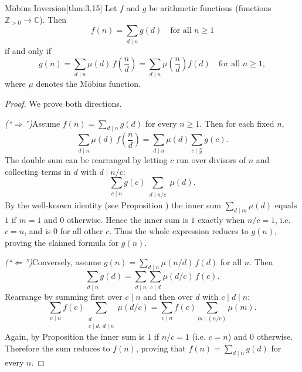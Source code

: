 \documentclass[10pt]{article}
\theoremstyle{definition}
\theoremstyle{plain}
\numberwithin{equation}{section}
\begin{document}

\begin{define}{Möbius Inversion}[thm:3.15]
Let $f$ and $g$ be arithmetic functions (functions $\mathbb{Z}_{>0}\to\mathbb{C}$). Then
\[
f(n)=\sum_{d\mid n} g(d)\quad\text{for all }n\ge 1
\]
if and only if
\[
g(n)=\sum_{d\mid n}\mu(d)\,f\!\left(\frac{n}{d}\right)
    =\sum_{d\mid n}\mu\!\left(\frac{n}{d}\right) f(d)
\quad\text{for all }n\ge 1,
\]
where $\mu$ denotes the Möbius function.
\end{define}

\begin{proof}
We prove both directions.

\emph{(``$\Rightarrow$'')}\quad Assume $f(n)=\sum_{d\mid n} g(d)$ for every $n\ge 1$.
Then for each fixed $n$,
\[
\sum_{d\mid n}\mu(d)\,f\!\left(\frac{n}{d}\right)
= \sum_{d\mid n}\mu(d)\sum_{c\mid \frac{n}{d}} g(c).
\]
The double sum can be rearranged by letting $c$ run over divisors of $n$ and
collecting terms in $d$ with $d\mid n/c$:
\[
\sum_{c\mid n} g(c)\sum_{\substack{d\mid n/c}} \mu(d).
\]
By the well-known identity (see Proposition ) the inner sum
$\sum_{d\mid m}\mu(d)$ equals $1$ if $m=1$ and $0$ otherwise. Hence the inner
sum is $1$ exactly when $n/c=1$, i.e. $c=n$, and is $0$ for all other $c$.
Thus the whole expression reduces to $g(n)$, proving the claimed formula for $g(n)$.


\emph{(``$\Leftarrow$'')}\quad Conversely, assume
$g(n)=\sum_{d\mid n}\mu(n/d)\,f(d)$ for all $n$. Then
\[
\sum_{d\mid n} g(d)
= \sum_{d\mid n}\sum_{c\mid d}\mu(d/c)\,f(c).
\]
Rearrange by summing first over $c\mid n$ and then over $d$ with $c\mid d\mid n$:
\[
\sum_{c\mid n} f(c)\sum_{\substack{d\\ c\mid d,\ d\mid n}} \mu(d/c)
= \sum_{c\mid n} f(c)\sum_{m\mid (n/c)} \mu(m).
\]
Again, by Proposition  the inner sum is $1$ if $n/c=1$
(i.e. $c=n$) and $0$ otherwise. Therefore the sum reduces to $f(n)$, proving
that $f(n)=\sum_{d\mid n} g(d)$ for every $n$.
\end{proof}
\end{document}
